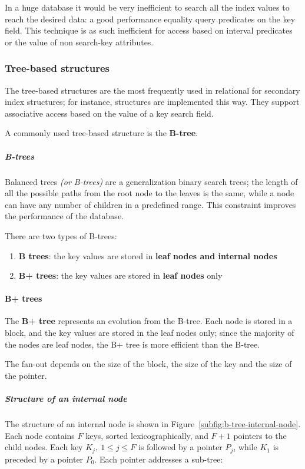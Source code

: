 \documentclass[english]{article}
\begin{document}
In a huge database it would be very inefficient to search all the index values to reach the desired data:
a good performance equality query predicates on the key field.
This technique is as such inefficient for access based on interval predicates or the value of non search-key attributes.

\subsubsection{Tree-based structures}

The tree-based structures are the most frequently used in relational \dbms for secondary index structures;
for instance, \sql structures are implemented this way.
They support associative access based on the value of a key search field.

A commonly used tree-based structure is the \textbf{B-tree}.

\subparagraph*{B-trees}
Balanced trees \textit{(or B-trees)} are a generalization binary search trees;
the length of all the possible paths from the root node to the leaves is the same, while a node can have any number of children in a predefined range.
This constraint improves the performance of the database.

There are two types of B-trees:

\begin{enumerate}
  \item \textbf{B trees}: the key values are stored in \textbf{leaf nodes and internal nodes}
  \item \textbf{B+ trees}: the key values are stored in \textbf{leaf nodes} only
\end{enumerate}

\paragraph{B+ trees}

The \textbf{B+ tree} represents an evolution from the B-tree.
Each node is stored in a block, and the key values are stored in the leaf nodes only;
since the majority of the nodes are leaf nodes, the B+ tree is more efficient than the B-tree.

The fan-out depends on the size of the block, the size of the key and the size of the pointer.

\subparagraph*{Structure of an internal node}
The structure of an internal node is shown in Figure~\ref{subfig:b-tree-internal-node}.
Each node contains \(F\) keys, sorted lexicographically, and \(F + 1\) pointers to the child nodes.
Each key \(K_j, \ 1 \leq j \leq F\) is followed by a pointer \(P_j\), while \(K_1\) is preceded by a pointer \(P_0\).
Each pointer addresses a sub-tree:
\end{document}
